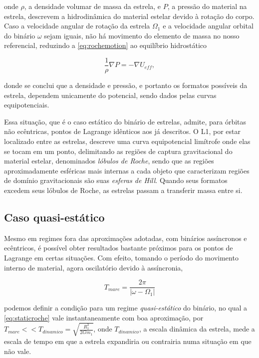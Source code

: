 onde $\rho$, a densidade volumar de massa da estrela, e $P$, a pressão do material na estrela, descrevem a hidrodinâmica do material estelar devido à rotação do corpo. Caso a velocidade angular de rotação da estrela $\Omega_1$ e a velocidade angular orbital do binário $\omega$ sejam iguais, não há movimento do elemento de massa no nosso referencial, reduzindo a \ref{eq:rochemotion} ao equilíbrio hidrostático

\begin{equation}
    \label{eq:staticroche}
    \frac{1}{\rho}\nabla P = -\nabla U_{eff},
\end{equation}

donde se conclui que a densidade e pressão, e portanto os formatos possíveis da estrela, dependem unicamente do potencial, sendo dados pelas curvas equipotenciais.

Essa situação, que é o caso estático do binário de estrelas, admite, para órbitas não ecêntricas, pontos de Lagrange idênticos aos já descritos. O L1, por estar localizado entre as estrelas, descreve uma curva equipotencial limítrofe onde elas se tocam em um ponto, delimitando as regiões de captura gravitacional do material estelar, denominados \textit{lóbulos de Roche}, sendo que as regiões aproximadamente esféricas mais internas a cada objeto que caracterizam regiões de domínio gravitacionais são suas \textit{esferas de Hill}. Quando seus formatos excedem seus lóbulos de Roche, as estrelas passam a transferir massa entre si.

\subsection{Caso quasi-estático}

Mesmo em regimes fora das aproximações adotadas, com binários assíncronos e ecêntricos, é possível obter resultados bastante próximos para os pontos de Lagrange em certas situações. Com efeito, tomando o período do movimento interno de material, agora oscilatório devido à assíncronia,

\begin{equation}
    T_{mare} = \frac{2\pi}{|\omega - \Omega_1|}
\end{equation}

podemos definir a condição para um regime \textit{quasi-estático} do binário, no qual a \ref{eq:staticroche} vale instantaneamente com boa aproximação, por $T_{mare} << T_{dinamico} = \sqrt{\frac{R_1^3}{2Gm_1}}$, onde $T_{dinamico} $, a escala dinâmica da estrela, mede a escala de tempo em que a estrela expandiria ou contrairia numa situação em que \label{eq:staticroche} não vale.

